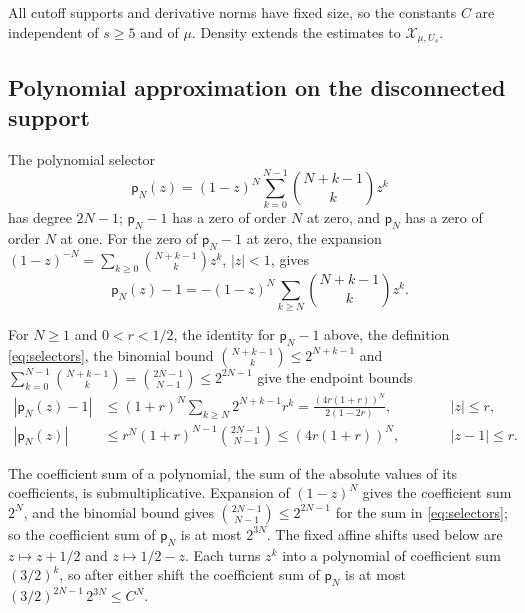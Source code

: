 \documentclass[11pt]{amsart}
\numberwithin{equation}{section}
\theoremstyle{definition}
\begin{document}
All cutoff supports and derivative norms have fixed size, so the
constants \(C\) are independent of \(s\ge5\) and of \(\mu\). Density
extends the estimates to \(\mathcal X_{\mu,U_s}\).

\subsection{Polynomial approximation on the disconnected support}

The polynomial selector
\begin{equation}
 \mathsf p_N(z)
 =(1-z)^N\sum_{k=0}^{N-1}\binom{N+k-1}{k}z^k
 \label{eq:selectors}
\end{equation}
has degree \(2N-1\); \(\mathsf p_N-1\) has a zero of order \(N\) at
zero, and \(\mathsf p_N\) has a zero of order \(N\) at one. For the zero of \(\mathsf p_N-1\)
at zero, the expansion
\((1-z)^{-N}=\sum_{k\ge0}\binom{N+k-1}{k}z^k\), \(|z|<1\), gives
\[
 \mathsf p_N(z)-1
 =-(1-z)^N\sum_{k\ge N}\binom{N+k-1}{k}z^k .
\]

For \(N\ge1\) and \(0<r<1/2\), the identity for \(\mathsf p_N-1\)
above, the definition \eqref{eq:selectors}, the binomial bound \(\binom{N+k-1}{k}\le2^{N+k-1}\) and
\(\sum_{k=0}^{N-1}\binom{N+k-1}{k}=\binom{2N-1}{N-1}\le2^{2N-1}\) give
the endpoint bounds
\[
 \begin{aligned}
 |\mathsf p_N(z)-1|
 &\le(1+r)^N\sum_{k\ge N}2^{N+k-1}r^k
 =\frac{(4r(1+r))^N}{2(1-2r)},&\qquad&|z|\le r,\\
 |\mathsf p_N(z)|
 &\le r^N(1+r)^{N-1}\binom{2N-1}{N-1}
 \le(4r(1+r))^N,&&|z-1|\le r.
 \end{aligned}
\]

The coefficient sum of a polynomial, the sum of the absolute values of
its coefficients, is submultiplicative. Expansion of \((1-z)^N\) gives
the coefficient sum \(2^N\), and the binomial bound gives
\(\binom{2N-1}{N-1}\le2^{2N-1}\) for the sum in \eqref{eq:selectors};
so the coefficient sum of \(\mathsf p_N\) is at most \(2^{3N}\). The
fixed affine shifts used below are \(z\mapsto z+1/2\) and
\(z\mapsto1/2-z\). Each turns \(z^k\) into a polynomial of coefficient
sum \((3/2)^k\), so after either shift the coefficient sum of
\(\mathsf p_N\) is at most \((3/2)^{2N-1}\,2^{3N}\le C^N\).
\end{document}
